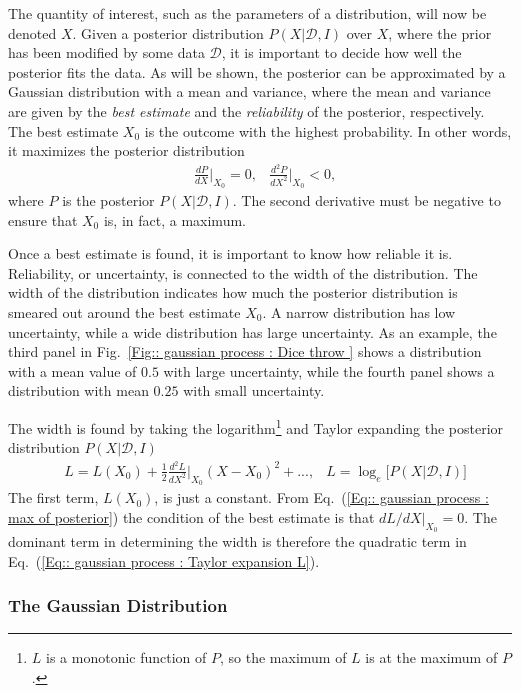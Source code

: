 \documentclass[twoside,english]{uiofysmaster}
\begin{document}
{The quantity of interest, such as the parameters of a distribution, will now be denoted $X$. Given a posterior distribution $P(X| \mathcal{D}, I)$ over $X$, where the prior has been modified by some data $\mathcal{D}$, it is important to decide how well the posterior fits the data. As will be shown, the posterior can be approximated by a Gaussian distribution with a mean and variance, where the mean and variance are given by the \textit{best estimate} and the \textit{reliability} of the posterior, respectively. The best estimate $X_0$  is the outcome with the highest probability. In other words, it maximizes the posterior distribution
\begin{align}\label{Eq:: gaussian process : max of posterior}
&\frac{dP}{dX}\Big|_{X_0} = 0, &\frac{d^2P}{dX^2}\Big|_{X_0} < 0,
\end{align}
where $P$ is the posterior $P(X| \mathcal{D}, I)$. The second derivative must be negative to ensure that $X_0$ is, in fact, a maximum. 

Once a best estimate is found, it is important to know how reliable it is. Reliability, or uncertainty, is connected to the width of the distribution. The width of the distribution indicates how much the posterior distribution is smeared out around the best estimate $X_0$. A narrow distribution has low uncertainty, while a wide distribution has large uncertainty. As an example, the third panel in Fig.~\ref{Fig:: gaussian process : Dice throw } shows a distribution with a mean value of $0.5$ with large uncertainty, while the fourth panel shows a distribution with mean $0.25$ with small uncertainty. 

The width is found by taking the logarithm\footnote{$L$ is a monotonic function of $P$, so the maximum of $L$ is at the maximum of $P$.} and Taylor expanding the posterior distribution $P(X| \mathcal{D}, I)$
\begin{align}
&L = L(X_0) + \frac{1}{2} \frac{d^2L}{dX^2}\Big|_{X_0} (X-X_0)^2 +... ,&L = \log_e \Big[P(X | \mathcal{D}, I ) \Big]\label{Eq:: gaussian process : Taylor expansion L}
\end{align}
The first term, $L(X_0)$, is just a constant. From Eq.~(\ref{Eq:: gaussian process : max of posterior}) the condition of the best estimate is that $dL/dX|_{X_0} =0$. The dominant term in determining the width is therefore the quadratic term in Eq.~(\ref{Eq:: gaussian process : Taylor expansion L}).

\subsubsection{The Gaussian Distribution}\label{Sec:: gaussian process : The Gaussian Distribution}

}
\end{document}
